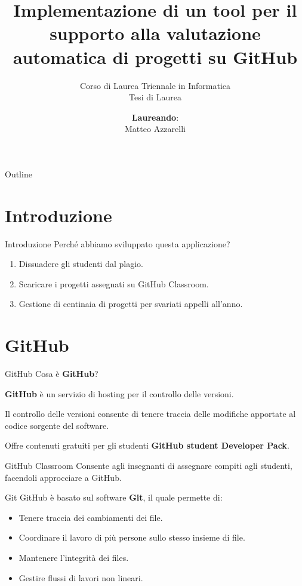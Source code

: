 \documentclass{beamer}
\title{Implementazione di un tool per il supporto alla valutazione automatica di progetti su GitHub}
\subtitle{\vspace{-0cm}Corso di Laurea Triennale in Informatica\\{\large Tesi di Laurea}}
\author{\vspace{-0.5cm}\textbf{Laureando}:\\Matteo Azzarelli}
\date{\vspace{2.5cm}\color{black}{\footnotesize{ANNO ACCADEMICO 2017/2018}}}
\begin{document}
	\maketitle

	\begin{frame}{Outline}
		\tableofcontents
	\end{frame}

	\section{Introduzione}
	
	\begin{frame}{Introduzione}
		Perché abbiamo sviluppato questa applicazione?
		\pause
		\begin{enumerate}[<+->]
			\item Dissuadere gli studenti dal plagio.
			\item Scaricare i progetti assegnati su GitHub Classroom.
			\item Gestione di centinaia di progetti per svariati appelli all'anno.
		\end{enumerate}
	\end{frame}

	\section{GitHub}
	
	\begin{frame}{GitHub}
		Cosa è \textbf{GitHub}?
		
		\vspace{0.5cm}
		\textbf{GitHub} è un servizio di hosting per il controllo delle versioni. 
		
		\vspace{0.5cm}
		Il controllo delle versioni consente di tenere traccia delle modifiche apportate al codice sorgente del software.
		\pause
		
		\begin{alertblock}{}
			Offre contenuti gratuiti per gli studenti \textbf{GitHub student Developer Pack}.
		\end{alertblock}
		\begin{alertblock}{GitHub Classroom}
			Consente agli insegnanti di assegnare compiti agli studenti, facendoli approcciare a GitHub.
		\end{alertblock}
	\end{frame}
	

	\begin{frame}{Git}
		GitHub è basato sul software \textbf{Git}, il quale permette di:
		\begin{itemize}[<+->]
			\item Tenere traccia dei cambiamenti dei file.
			\item Coordinare il lavoro di più persone sullo stesso insieme di file.
			\item Mantenere l'integrità dei files.
			\item Gestire flussi di lavori non lineari.
		\end{itemize}
	\end{frame}
	
\end{document}

